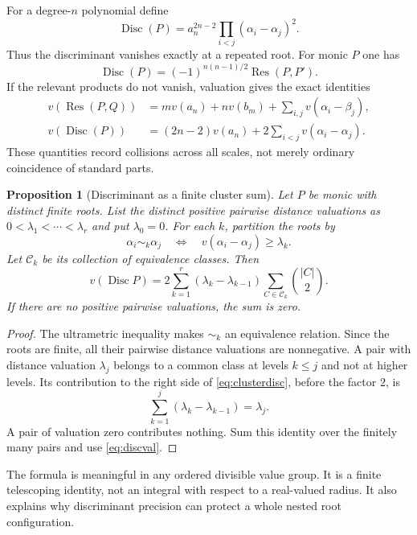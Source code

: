 \documentclass[11pt,letterpaper]{article}
\numberwithin{equation}{section}
\newtheorem{proposition}[proposition]{Proposition}
\theoremstyle{definition}
\theoremstyle{remark}
\newcommand{\Res}{\operatorname{Res}}
\newcommand{\Disc}{\operatorname{Disc}}
\begin{document}
For a degree-$n$ polynomial define
\begin{equation}\label{eq:discdef}
 \Disc(P)=a_n^{2n-2}\prod_{i<j}(\alpha_i-\alpha_j)^2.
\end{equation}
Thus the discriminant vanishes exactly at a repeated root. For monic
$P$ one has
\[
 \Disc(P)=(-1)^{n(n-1)/2}\Res(P,P').
\]
If the relevant products do not vanish, valuation gives the exact identities
\begin{align}
 v(\Res(P,Q))&=m v(a_n)+n v(b_m)
                      +\sum_{i,j}v(\alpha_i-\beta_j),\label{eq:resval}\\
 v(\Disc(P))&=(2n-2)v(a_n)
                      +2\sum_{i<j}v(\alpha_i-\alpha_j).\label{eq:discval}
\end{align}
These quantities record collisions across all scales, not merely ordinary
coincidence of standard parts.

\begin{proposition}[Discriminant as a finite cluster sum]\label{prop:clusterdisc}
Let $P$ be monic with distinct finite roots. List the distinct positive
pairwise distance valuations as
$0<\lambda_1<\cdots<\lambda_r$ and put $\lambda_0=0$.
For each $k$, partition the roots by
\[
 \alpha_i\sim_k\alpha_j
 \quad\Longleftrightarrow\quad
 v(\alpha_i-\alpha_j)\ge\lambda_k.
\]
Let $\mathcal C_k$ be its collection of equivalence classes. Then
\begin{equation}\label{eq:clusterdisc}
 v(\Disc P)=
 2\sum_{k=1}^r(\lambda_k-\lambda_{k-1})
          \sum_{C\in\mathcal C_k}\binom{|C|}{2}.
\end{equation}
If there are no positive pairwise valuations, the sum is zero.
\end{proposition}
\begin{proof}
The ultrametric inequality makes $\sim_k$ an equivalence relation. Since
the roots are finite, all their pairwise distance valuations are
nonnegative. A pair with distance valuation $\lambda_j$ belongs to a
common class at levels $k\le j$ and not at higher levels. Its contribution
to the right side of \eqref{eq:clusterdisc}, before the factor $2$, is
\[
 \sum_{k=1}^j(\lambda_k-\lambda_{k-1})=\lambda_j.
\]
A pair of valuation zero contributes nothing. Sum this identity over the
finitely many pairs and use \eqref{eq:discval}.
\end{proof}

The formula is meaningful in any ordered divisible value group. It is a
finite telescoping identity, not an integral with respect to a real-valued
radius. It also explains why discriminant precision can protect a whole
nested root configuration.
\end{document}
